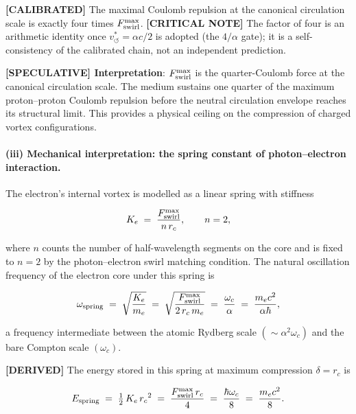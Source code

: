 \documentclass[11pt]{article}
\theoremstyle{definition}
\theoremstyle{plain}
\theoremstyle{remark}
\newcommand{\rc}{{r_c}}
\newcommand{\vchar}{v_{\!\boldsymbol{\circlearrowleft}}^{\ast}}
\begin{document}
        \textbf{[CALIBRATED]} The maximal Coulomb repulsion at the canonical circulation scale is exactly four times $F_{\rm swirl}^{\max}$. \textbf{[CRITICAL NOTE]} The factor of four is an arithmetic identity once $\vchar=\alpha c/2$ is adopted (the $4/\alpha$ gate); it is a self-consistency of the calibrated chain, not an independent prediction.

        \textbf{[SPECULATIVE] Interpretation}: $F_{\rm swirl}^{\max}$ is the quarter-Coulomb force at the canonical circulation scale. The medium sustains one quarter of the maximum proton--proton Coulomb repulsion before the neutral circulation envelope reaches its structural limit. This provides a physical ceiling on the compression of charged vortex configurations.

        \paragraph{(iii) Mechanical interpretation: the spring constant of photon--electron interaction.}

        The electron's internal vortex is modelled as a linear spring with stiffness

        \begin{align}
            K_e \;=\; \frac{F_{\rm swirl}^{\max}}{n\,\rc},
            \qquad n = 2,
            \label{eq:spring_K}
        \end{align}

        where $n$ counts the number of half-wavelength segments on the core and is fixed to $n=2$ by the photon--electron swirl matching condition. The natural oscillation frequency of the electron core under this spring is

        \begin{align}
            \omega_{\rm spring}
            \;=\; \sqrt{\frac{K_e}{m_e}}
            \;=\; \sqrt{\frac{F_{\rm swirl}^{\max}}{2\,\rc\,m_e}}
            \;=\; \frac{\omega_c}{\alpha}
            \;=\; \frac{m_e c^2}{\alpha\hbar},
            \label{eq:omega_spring}
        \end{align}

        a frequency intermediate between the atomic Rydberg scale $(\sim\alpha^2\omega_c)$ and the bare Compton scale $(\omega_c)$.

        \textbf{[DERIVED]} The energy stored in this spring at maximum compression $\delta = \rc$ is

        \begin{align}
            E_{\rm spring}
            \;=\; \tfrac{1}{2}\,K_e\,\rc^2
            \;=\; \frac{F_{\rm swirl}^{\max}\,\rc}{4}
            \;=\; \frac{\hbar\omega_c}{8}
            \;=\; \frac{m_e c^2}{8}.
            \label{eq:Espring}
        \end{align}
\end{document}
